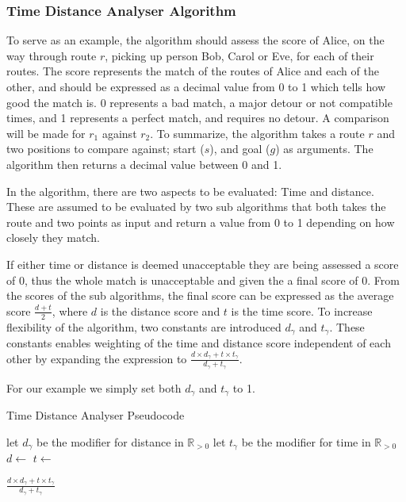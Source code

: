 \subsubsection{Time Distance Analyser Algorithm}
To serve as an example, the algorithm should assess the score of Alice, on the way through route $r$, picking up person Bob, Carol or Eve, for each of their routes.
The score represents the match of the routes of Alice and each of the other, and should be expressed as a decimal value from 0 to 1 which tells how good the match is.
0 represents a bad match, a major detour or not compatible times, and 1 represents a perfect match, and requires no detour.
A comparison will be made for $r_1$ against $r_2$.
To summarize, the algorithm takes a route $r$ and two positions to compare against; start ($s$), and goal ($g$) as arguments.
The algorithm then returns a decimal value between 0 and 1.

In the algorithm, there are two aspects to be evaluated: Time and distance.
These are assumed to be evaluated by two sub algorithms that both takes the route and two points as input and return a value from 0 to 1 depending on how closely they match.

If either time or distance is deemed unacceptable they are being assessed a score of 0, thus the whole match is unacceptable and given the a final score of 0.
From the scores of the sub algorithms, the final score can be expressed as the average score $\frac{d+t}{2}$, where $d$ is the distance score and $t$ is the time score.
To increase flexibility of the algorithm, two constants are introduced $d_\gamma$ and $t_\gamma$.
These constants enables weighting of the time and distance score independent of each other by expanding the expression to $\frac{d\times d_\gamma+t\times t_\gamma}{d_\gamma+t_\gamma}$.

For our example we simply set both $d_\gamma$ and $t_\gamma$ to 1. 

\begin{algorithm}
	\caption{Time Distance Analyser Pseudocode}
	\label{alg:timedistanalyser}
	\begin{algorithmic}[1]
		\Require 
		\Statex let $d_\gamma$ be the modifier for distance in $\mathbb{R}_{>0}$
		\Statex let $t_\gamma$ be the modifier for time in $\mathbb{R}_{>0}$
		\Statex 
			\State $d\gets$
			\State $t\gets$
			
				\State \Return $\frac{d\times d_\gamma+t\times t_\gamma}{d_\gamma+t_\gamma}$
			\Else
				\State{}
			\EndIf
		\EndFunction
	\end{algorithmic}
\end{algorithm}

